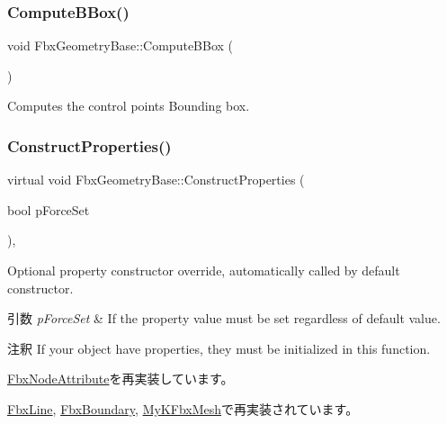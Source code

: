 \subsubsection{\texorpdfstring{Compute\+B\+Box()}{ComputeBBox()}}
{\footnotesize\ttfamily void Fbx\+Geometry\+Base\+::\+Compute\+B\+Box (\begin{DoxyParamCaption}{ }\end{DoxyParamCaption})}

Computes the control points Bounding box. \mbox{\label{class_fbx_geometry_base_a94ee142ac1d40be3aebb4d9441431921}} 
\subsubsection{\texorpdfstring{Construct\+Properties()}{ConstructProperties()}}
{\footnotesize\ttfamily virtual void Fbx\+Geometry\+Base\+::\+Construct\+Properties (\begin{DoxyParamCaption}\item[{bool}]{p\+Force\+Set }\end{DoxyParamCaption})\hspace{0.3cm}{\ttfamily [protected]}, {\ttfamily [virtual]}}

Optional property constructor override, automatically called by default constructor. 
\begin{DoxyParams}{引数}
{\em p\+Force\+Set} & If the property value must be set regardless of default value. \\
\hline
\end{DoxyParams}
\begin{DoxyRemark}{注釈}
If your object have properties, they must be initialized in this function. 
\end{DoxyRemark}


\hyperlink{class_fbx_node_attribute_a042eb9949a9b9634dcc5f126e82fd04a}{Fbx\+Node\+Attribute}を再実装しています。



\hyperlink{class_fbx_line_a48df4b6cd889814d3fe7ca5bb09bcc78}{Fbx\+Line}, \hyperlink{class_fbx_boundary_acb50e021b1e9920026c975613a949537}{Fbx\+Boundary}, \hyperlink{class_my_k_fbx_mesh_a9fc01e7c17e2e1456cf7859f05d253e8}{My\+K\+Fbx\+Mesh}で再実装されています。

\mbox{\label{class_fbx_geometry_base_acf13ddd2717d2f1ca4dc57b5ea0801b1}} 
